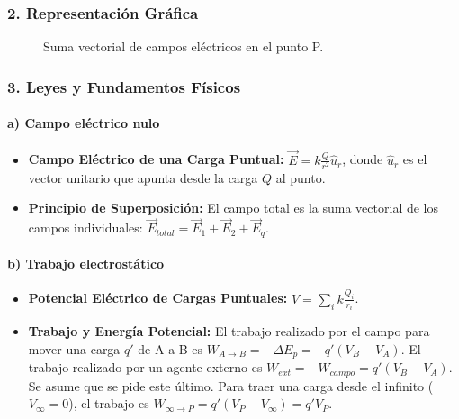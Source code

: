 \subsubsection*{2. Representación Gráfica}
\begin{figure}[H]
    \centering
    \caption{Suma vectorial de campos eléctricos en el punto P.}
\end{figure}

\subsubsection*{3. Leyes y Fundamentos Físicos}
\paragraph*{a) Campo eléctrico nulo}
\begin{itemize}
    \item \textbf{Campo Eléctrico de una Carga Puntual:} $\vec{E} = k \frac{Q}{r^2} \hat{u}_r$, donde $\hat{u}_r$ es el vector unitario que apunta desde la carga $Q$ al punto.
    \item \textbf{Principio de Superposición:} El campo total es la suma vectorial de los campos individuales: $\vec{E}_{total} = \vec{E}_1 + \vec{E}_2 + \vec{E}_q$.
\end{itemize}
\paragraph*{b) Trabajo electrostático}
\begin{itemize}
    \item \textbf{Potencial Eléctrico de Cargas Puntuales:} $V = \sum_i k \frac{Q_i}{r_i}$.
    \item \textbf{Trabajo y Energía Potencial:} El trabajo realizado por el campo para mover una carga $q'$ de A a B es $W_{A \to B} = - \Delta E_p = -q'(V_B - V_A)$. El trabajo realizado por un agente externo es $W_{ext} = -W_{campo} = q'(V_B - V_A)$. Se asume que se pide este último. Para traer una carga desde el infinito ($V_\infty = 0$), el trabajo es $W_{\infty \to P} = q'(V_P - V_\infty) = q'V_P$.
\end{itemize}
